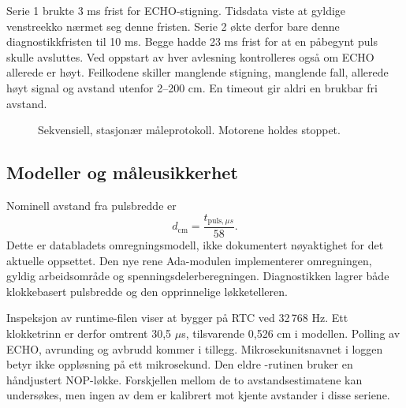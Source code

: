 Serie 1 brukte 3 ms frist for ECHO-stigning. Tidsdata viste at gyldige
venstreekko nærmet seg denne fristen. Serie 2 økte derfor bare denne
diagnostikkfristen til 10 ms. Begge hadde 23 ms frist for at en påbegynt
puls skulle avsluttes. Ved oppstart av hver avlesning kontrolleres også
om ECHO allerede er høyt. Feilkodene skiller manglende stigning,
manglende fall, allerede høyt signal og avstand utenfor 2--200 cm.
En timeout gir aldri en brukbar fri avstand.

\begin{figure}[htbp]
\centering
{}
\caption{Sekvensiell, stasjonær måleprotokoll. Motorene holdes stoppet.}
\end{figure}

\subsection{Modeller og måleusikkerhet}
Nominell avstand fra pulsbredde er
\begin{equation}
 d_{\mathrm{cm}}=\frac{t_{\mathrm{puls},\mu s}}{58}.
\end{equation}
Dette er databladets omregningsmodell\cite{hcsr04}, ikke dokumentert
nøyaktighet for det aktuelle oppsettet. Den nye rene Ada-modulen
 implementerer omregningen, gyldig
arbeidsområde og spenningsdelerberegningen. Diagnostikken lagrer både
klokkebasert pulsbredde og den opprinnelige løkketelleren.

Inspeksjon av runtime-filen  viser at
 bygger på RTC ved 32\,768 Hz. Ett klokketrinn
er derfor omtrent 30,5 \(\mu\)s, tilsvarende 0,526 cm i modellen.
Polling av ECHO, avrunding og avbrudd kommer i tillegg. Mikrosekunitsnavnet
i loggen betyr ikke oppløsning på ett mikrosekund. Den eldre
-rutinen bruker en håndjustert NOP-løkke. Forskjellen
mellom de to avstandsestimatene kan undersøkes, men ingen av dem er
kalibrert mot kjente avstander i disse seriene.

